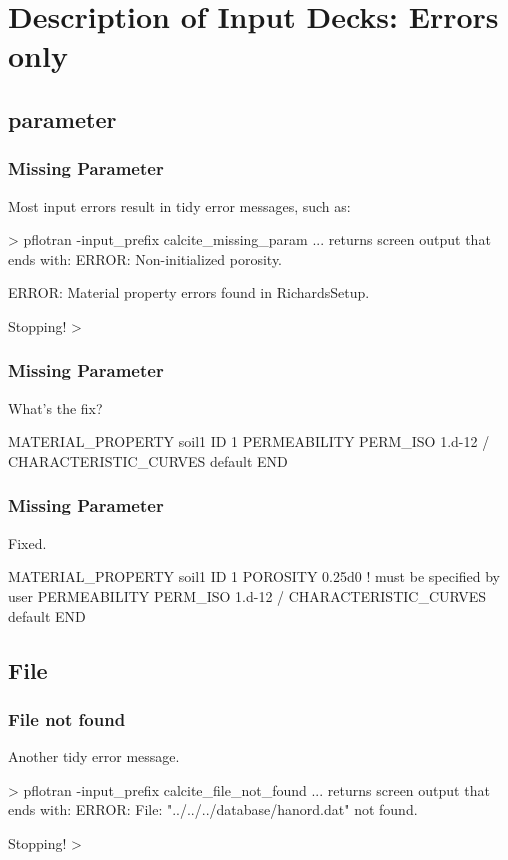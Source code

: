 \documentclass{beamer}
\newcommand\gehcomment[1]{{{\color{orange} #1}}}
\newcommand\redcomment[1]{{{\color{red} #1}}}
\newcommand\bluecomment[1]{{{\color{blue} #1}}}
\newcommand\magentacomment[1]{{{\color{magenta} #1}}}
\begin{document}
\section{Description of Input Decks: Errors only }

\subsection{parameter}

\begin{frame}\frametitle{Missing Parameter}
Most input errors result in tidy error messages, such as:
\begin{semiverbatim}

> pflotran -input_prefix calcite_missing_param
... \gehcomment{returns screen output that ends with:}
  ERROR: Non-initialized porosity.

  ERROR: Material property errors found in RichardsSetup.

  Stopping!
>
\end{semiverbatim}

\end{frame}

\begin{frame}\frametitle{Missing Parameter}
\redcomment{What's the fix?}
\begin{semiverbatim}

MATERIAL_PROPERTY soil1
  ID 1
  PERMEABILITY
    PERM_ISO 1.d-12
  /
  CHARACTERISTIC_CURVES default
END
\end{semiverbatim}

\end{frame}

\begin{frame}\frametitle{Missing Parameter}
\redcomment{Fixed.}
\begin{semiverbatim}

MATERIAL_PROPERTY soil1
  ID 1
  \magentacomment{POROSITY 0.25d0} \bluecomment{! must be specified by user}
  PERMEABILITY
    PERM_ISO 1.d-12
  /
  CHARACTERISTIC_CURVES default
END
\end{semiverbatim}

\end{frame}

\subsection{File}
\begin{frame}\frametitle{File not found}
Another tidy error message.
\begin{semiverbatim}

> pflotran -input_prefix calcite_file_not_found
... \gehcomment{returns screen output that ends with:}
  ERROR: File: "../../../database/hanord.dat" not found.

  Stopping!
>
\end{semiverbatim}

\end{frame}
\end{document}

